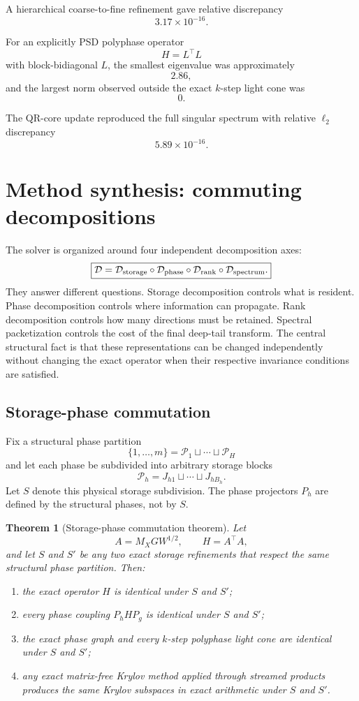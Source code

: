 \documentclass[11pt]{article}
\newtheorem{theorem}{Theorem}[section]
\theoremstyle{definition}
\theoremstyle{remark}
\begin{document}
A hierarchical coarse-to-fine refinement gave relative discrepancy
\[
3.17\times10^{-16}.
\]

For an explicitly PSD polyphase operator
\[
H=L^\top L
\]
with block-bidiagonal \(L\), the smallest eigenvalue was approximately
\[
2.86,
\]
and the largest norm observed outside the exact \(k\)-step light cone was
\[
\boxed{0}.
\]

The QR-core update reproduced the full singular spectrum with relative
\(\ell_2\) discrepancy
\[
5.89\times10^{-16}.
\]


\section{Method synthesis: commuting decompositions}

The solver is organized around four independent decomposition axes:
\[
\boxed{
\mathcal D
=
\mathcal D_{\rm storage}
\circ
\mathcal D_{\rm phase}
\circ
\mathcal D_{\rm rank}
\circ
\mathcal D_{\rm spectrum}.
}
\]
They answer different questions.  Storage decomposition controls what is
resident.  Phase decomposition controls where information can propagate.
Rank decomposition controls how many directions must be retained.  Spectral
packetization controls the cost of the final deep-tail transform.  The central
structural fact is that these representations can be changed independently
without changing the exact operator when their respective invariance
conditions are satisfied.

\subsection{Storage-phase commutation}

Fix a structural phase partition
\[
\{1,\ldots,m\}=\mathcal P_1\sqcup\cdots\sqcup\mathcal P_H
\]
and let each phase be subdivided into arbitrary storage blocks
\[
\mathcal P_h
=
J_{h1}\sqcup\cdots\sqcup J_{hB_h}.
\]
Let $S$ denote this physical storage subdivision.  The phase projectors
$P_h$ are defined by the structural phases, not by $S$.

\begin{theorem}[Storage-phase commutation theorem]
Let
\[
A=M_XGW^{1/2},
\qquad H=A^\top A,
\]
and let $S$ and $S'$ be any two exact storage refinements that respect the
same structural phase partition.  Then:
\begin{enumerate}[label=(\roman*)]
\item the exact operator $H$ is identical under $S$ and $S'$;
\item every phase coupling $P_hHP_g$ is identical under $S$ and $S'$;
\item the exact phase graph and every $k$-step polyphase light cone are
identical under $S$ and $S'$;
\item any exact matrix-free Krylov method applied through streamed products
produces the same Krylov subspaces in exact arithmetic under $S$ and $S'$.
\end{enumerate}
\end{theorem}
\end{document}
